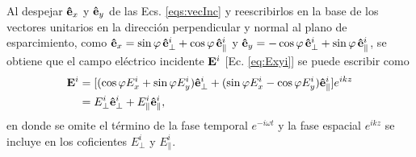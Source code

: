 Al despejar $\vu{e}_x$ y $\vu{e}_y$  de las Ecs. \eqref{eqs:vecInc} y reescribirlos en la base de los vectores unitarios en la dirección perpendicular y normal al plano de esparcimiento, como $\vu{e}_x = \sin\varphi\,\vu{e}_{\perp}^i + \cos\varphi\,\vu{e}_{\parallel}^i$ y $\vu{e}_y = - \cos\varphi \,\vu{e}_{\perp}^i + \sin\varphi\,\vu{e}_{\parallel}^i$, se obtiene que el campo eléctrico incidente $\vb{E}^i$ [Ec. \eqref{eq:Exyi}] se puede escribir como
\begin{align}
\vb{E}^i &= [(\cos\varphi E_{x}^i + \sin\varphi E_{y}^i)\vu{e}_{\perp}^i +
			 (\sin\varphi E_{x}^i - \cos\varphi E_{y}^i)\vu{e}_{\parallel}^i]
			 e^{ikz} \\
			 &= E_{\perp}^i  \vu{e}_{\perp}^i + E_{\parallel}^i\vu{e}_{\parallel}^i,
		\label{eq:EIncidente}
\end{align}
en donde se omite el término de la fase temporal $e^{-i\omega t}$ y la fase espacial $e^{ikz}$ se incluye en los coficientes $E_\perp^i$ y $E_\parallel^i$. 


